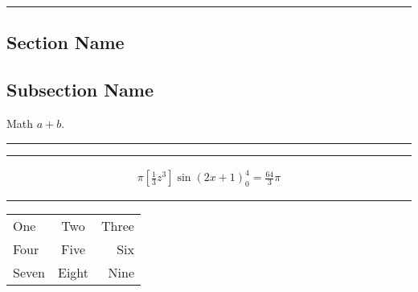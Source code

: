 \documentclass{article}
\begin{document}
\START
\hrule\bigskip

\begin{demohigh}
\newcommand*{\myversion}{2021C}
\newcommand*{\mydate}{Version \myversion\ (\the\year-\mylpad\month-\mylpad\day)}
\newcommand*{\mylpad}[1]{\ifnum#1<10 0\the#1\else\the#1\fi}
\setlength{\arraycolsep}{6pt}
\section{Section Name}
\subsection*{Subsection Name}
Math $a+b$.
\end{demohigh}
\ENDTEST

\bigskip\hrule\bigskip

\begin{demohigh}[language=latex/latex2]
\def\abcd#1#2{%
  \newcounter{#1}%
  \setcounter{#1}{#2}%
  \thechoice
}
\abcd{choice}{1}
\end{demohigh}
\ENDTEST

%

\bigskip\hrule\bigskip

\begin{demohigh}[language=latex/math]
\begin{align}
  \pi\left[\frac13z^3\right]\sin(2x+1)_0^4 = \frac{64}{3}\pi
\end{align}
\end{demohigh}
\ENDTEST

\bigskip\hrule\bigskip

\begin{demohigh}[language=latex/table]
\begin{tabular}[b]{|lc|r|}
\hline
One   &  Two  & Three \\
Four  & Five  &   Six \\
\hline%
Seven & Eight &  Nine \\
\hline
\end{tabular}
\end{demohigh}
\ENDTEST
\end{document}
